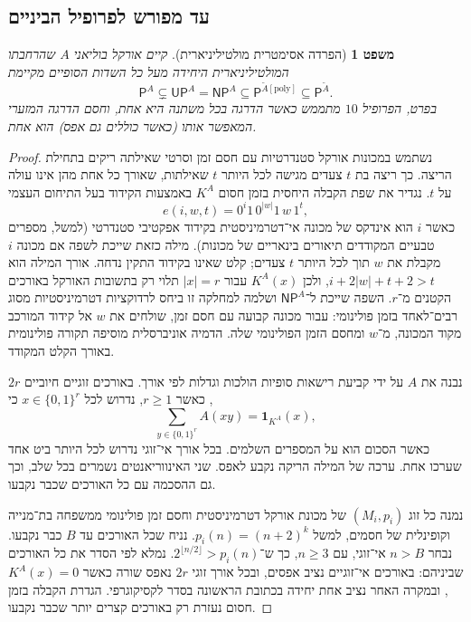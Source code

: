 \documentclass[11pt,a4paper]{article}
\newtheorem{theorem}{משפט}[section]
\theoremstyle{definition}
\theoremstyle{remark}
\newcommand{\bits}{\{0,1\}}
\newcommand{\PP}{\mathsf{P}}
\newcommand{\NP}{\mathsf{NP}}
\newcommand{\UP}{\mathsf{UP}}
\newcommand{\Atil}{\widetilde A}
\begin{document}
\subsection{עד מפורש לפרופיל הביניים}
\begin{theorem}[הפרדה אסימטרית מולטיליניארית]\label{thm:w10}
קיים אורקל בוליאני $A$ שהרחבתו המולטיליניארית היחידה מעל כל השדות הסופיים מקיימת
\begin{equation}\label{eq:w10}
\PP^A\subsetneq\UP^A=\NP^A\subseteq\PP^{\Atil[\mathrm{poly}]}\subseteq\PP^{\Atil}.
\end{equation}
בפרט, הפרופיל $10$ מתממש כאשר הדרגה בכל משתנה היא אחת, וחסם הדרגה המזערי המאפשר אותו (כאשר כוללים גם אפס) הוא אחת.
\end{theorem}
\begin{proof}
נשתמש במכונות אורקל סטנדרטיות עם חסם זמן וסרטי שאילתה ריקים בתחילת הריצה. כך ריצה בת $t$ צעדים מגישה לכל היותר $t$ שאילתות, שאורך כל אחת מהן אינו עולה על $t$. נגדיר את שפת הקבלה היחסית בזמן חסום $K^A$ באמצעות הקידוד בעל התיחום העצמי
\[
e(i,w,t)=0^i1\,0^{|w|}1\,w\,1^t,
\]
כאשר $i$ הוא אינדקס של מכונה אי־דטרמיניסטית בקידוד אפקטיבי סטנדרטי (למשל, מספרים טבעיים המקודדים תיאורים בינאריים של מכונות). מילה כזאת שייכת לשפה אם מכונה $i$ מקבלת את $w$ תוך לכל היותר $t$ צעדים; קלט שאינו בקידוד התקין נדחה. אורך המילה הוא $i+2|w|+t+2>t$, ולכן $K^A(x)$ עבור $|x|=r$ תלוי רק בתשובות האורקל באורכים הקטנים מ־$r$. השפה שייכת ל־$\NP^A$ ושלמה למחלקה זו ביחס לרדוקציות דטרמיניסטיות מסוג רבים־לאחד בזמן פולינומי: עבור מכונה קבועה עם חסם זמן, שולחים את $w$ אל קידוד המורכב מקוד המכונה, מ־$w$ ומחסם הזמן הפולינומי שלה. הדמיה אוניברסלית מוסיפה תקורה פולינומית באורך הקלט המקודד.

נבנה את $A$ על ידי קביעת רישאות סופיות הולכות וגדלות לפי אורך. באורכים זוגיים חיוביים $2r$, כאשר $r\ge1$, נדרוש לכל $x\in\bits^r$ כי
\begin{equation}\label{eq:gi1}
\sum_{y\in\bits^r}A(xy)=\mathbf1_{K^A}(x),
\end{equation}
כאשר הסכום הוא על המספרים השלמים. בכל אורך אי־זוגי נדרוש לכל היותר ביט אחד שערכו אחת. ערכה של המילה הריקה נקבע לאפס. שני האינווריאנטים נשמרים בכל שלב, וכך גם ההסכמה עם כל האורכים שכבר נקבעו.

נמנה כל זוג $(M_i,p_i)$ של מכונת אורקל דטרמיניסטית וחסם זמן פולינומי ממשפחה בת־מנייה וקופינלית של חסמים, למשל $p_i(n)=(n+2)^k$. נניח שכל האורכים עד $B$ כבר נקבעו. נבחר $n>B$ אי־זוגי, עם $n\ge3$, כך ש־$2^{\lfloor n/2\rfloor}>p_i(n)$. נמלא לפי הסדר את כל האורכים שביניהם: באורכים אי־זוגיים נציב אפסים, ובכל אורך זוגי $2r$ נאפס שורה כאשר $K^A(x)=0$, ובמקרה האחר נציב אחת יחידה בכתובת הראשונה בסדר לקסיקוגרפי. הגדרת הקבלה בזמן חסום נעזרת רק באורכים קצרים יותר שכבר נקבעו.


\end{proof}
\end{document}
